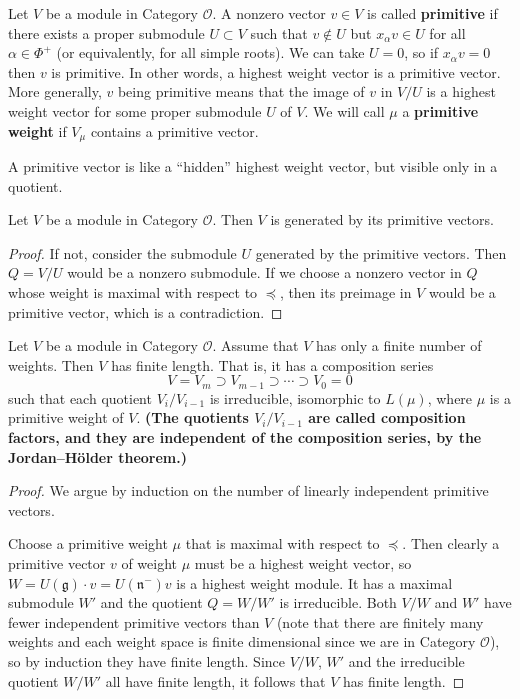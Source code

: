 \documentclass[12pt]{article}
\begin{document}
\begin{definition}
    Let $V$ be a module in Category $\mathcal{O}$. A nonzero vector $v \in V$ is called \textbf{primitive} if there exists a proper submodule $U \subset V$ such that $v \notin U$ but $x_\alpha v \in U$ for all $\alpha \in \Phi^+$ (or equivalently, for all simple roots). We can take $U=0$, so if $x_\alpha v=0$ then $v$ is primitive. In other words, a highest weight vector is a primitive vector. More generally, $v$ being primitive means that the image of $v$ in $V/U$ is a highest weight vector for some proper submodule $U$ of $V$. We will call $\mu$ a \textbf{primitive weight} if $V_\mu$ contains a primitive vector.
\end{definition}

A primitive vector is like a “hidden” highest weight vector, but visible only in a quotient.

\begin{proposition}
    Let $V$ be a module in Category $\mathcal{O}$. Then $V$ is generated by its primitive vectors.
\end{proposition}

\begin{proof}
    If not, consider the submodule $U$ generated by the primitive vectors. Then $Q = V/U$ would be a nonzero submodule. If we choose a nonzero vector in $Q$ whose weight is maximal with respect to $\preceq$, then its preimage in $V$ would be a primitive vector, which is a contradiction.
\end{proof}

\begin{proposition}
    Let $V$ be a module in Category $\mathcal{O}$. Assume that $V$ has only a finite number of weights. Then $V$ has finite length. That is, it has a composition series
    \[
        V = V_m \supset V_{m-1} \supset \cdots \supset V_0 = 0
    \]
    such that each quotient $V_i/V_{i-1}$ is irreducible, isomorphic to $L(\mu)$, where $\mu$ is a primitive weight of $V$. \textbf{(The quotients $V_i/V_{i-1}$ are called composition factors, and they are independent of the composition series, by the Jordan–Hölder theorem.)}
\end{proposition}

\begin{proof}
    We argue by induction on the number of linearly independent primitive vectors.

    Choose a primitive weight $\mu$ that is maximal with respect to $\preceq$. Then clearly a primitive vector $v$ of weight $\mu$ must be a highest weight vector, so $W = U(\mathfrak{g}) \cdot v = U(\mathfrak{n}^-)v$ is a highest weight module. It has a maximal submodule $W'$ and the quotient $Q = W/W'$ is irreducible. Both $V/W$ and $W'$ have fewer independent primitive vectors than $V$ (note that there are finitely many weights and each weight space is finite dimensional since we are in Category $\mathcal{O}$), so by induction they have finite length. Since $V/W$, $W'$ and the irreducible quotient $W/W'$ all have finite length, it follows that $V$ has finite length.
\end{proof}
\end{document}

